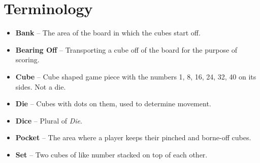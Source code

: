 \section{Terminology}
\begin{itemize}
    \item \textbf{Bank} -- The area of the board in which the cubes start off.
    \item \textbf{Bearing Off} -- Transporting a cube off of the board for the purpose of scoring.
    \item \textbf{Cube} -- Cube shaped game piece with the numbers 1, 8, 16, 24, 32, 40 on its sides. Not a die.
    \item \textbf{Die} -- Cubes with dots on them, used to determine movement.
    \item \textbf{Dice} -- Plural of \textit{Die}.
    \item \textbf{Pocket} -- The area where a player keeps their pinched and borne-off cubes.
    \item \textbf{Set} -- Two cubes of like number stacked on top of each other.
\end{itemize}